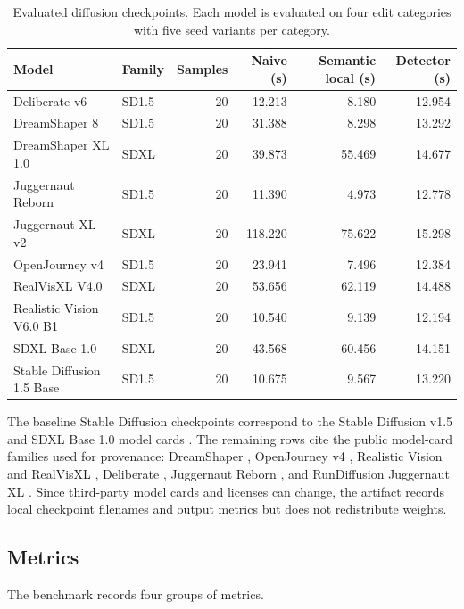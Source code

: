 \documentclass[final,5p,times,number,sort&compress]{elsarticle}
\begin{document}
\begin{table}[t]
\centering
\small
\setlength{\tabcolsep}{5pt}
\caption{Evaluated diffusion checkpoints. Each model is evaluated on four edit categories with five seed variants per category.}
\label{tab:models}
\begin{tabular}{llrrrr}
\toprule
Model & Family & Samples & Naive (s) & Semantic local (s) & Detector (s) \\
\midrule
Deliberate v6 & SD1.5 & 20 & 12.213 & 8.180 & 12.954 \\
DreamShaper 8 & SD1.5 & 20 & 31.388 & 8.298 & 13.292 \\
DreamShaper XL 1.0 & SDXL & 20 & 39.873 & 55.469 & 14.677 \\
Juggernaut Reborn & SD1.5 & 20 & 11.390 & 4.973 & 12.778 \\
Juggernaut XL v2 & SDXL & 20 & 118.220 & 75.622 & 15.298 \\
OpenJourney v4 & SD1.5 & 20 & 23.941 & 7.496 & 12.384 \\
RealVisXL V4.0 & SDXL & 20 & 53.656 & 62.119 & 14.488 \\
Realistic Vision V6.0 B1 & SD1.5 & 20 & 10.540 & 9.139 & 12.194 \\
SDXL Base 1.0 & SDXL & 20 & 43.568 & 60.456 & 14.151 \\
Stable Diffusion 1.5 Base & SD1.5 & 20 & 10.675 & 9.567 & 13.220 \\
\bottomrule
\end{tabular}
\end{table}

The baseline Stable Diffusion checkpoints correspond to the Stable Diffusion v1.5 and SDXL Base 1.0 model cards \citep{hfStableDiffusionV15,hfStableDiffusionXLBase}. The remaining rows cite the public model-card families used for provenance: DreamShaper \citep{hfDreamShaper8,hfDreamShaperXL}, OpenJourney v4 \citep{hfOpenJourneyV4}, Realistic Vision and RealVisXL \citep{hfRealisticVisionV6,hfRealVisXLV4}, Deliberate \citep{hfDeliberate}, Juggernaut Reborn \citep{hfJuggernautReborn}, and RunDiffusion Juggernaut XL \citep{hfJuggernautXLV2}. Since third-party model cards and licenses can change, the artifact records local checkpoint filenames and output metrics but does not redistribute weights.

\subsection{Metrics}

The benchmark records four groups of metrics.
\end{document}
